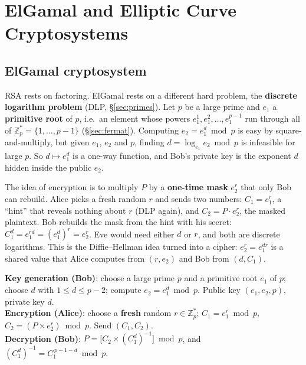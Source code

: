 \section{ElGamal and Elliptic Curve Cryptosystems \new}\label{sec:elgamal}

\subsection{ElGamal cryptosystem \new}

RSA rests on factoring. ElGamal rests on a different hard problem, the \textbf{discrete logarithm problem} (DLP, \S\ref{sec:primes}). Let $p$ be a large prime and $e_1$ a \textbf{primitive root} of $p$, i.e.\ an element whose powers $e_1^1, e_1^2, \dots, e_1^{p-1}$ run through all of $\mathbb{Z}_p^* = \{1, \dots, p-1\}$ (\S\ref{sec:fermat}). Computing $e_2 = e_1^d \bmod p$ is easy by square-and-multiply, but given $e_1$, $e_2$ and $p$, finding $d = \log_{e_1} e_2 \bmod p$ is infeasible for large $p$. So $d \mapsto e_1^d$ is a one-way function, and Bob's private key is the exponent $d$ hidden inside the public $e_2$.

The idea of encryption is to multiply $P$ by a \textbf{one-time mask} $e_2^r$ that only Bob can rebuild. Alice picks a fresh random $r$ and sends two numbers: $C_1 = e_1^r$, a ``hint'' that reveals nothing about $r$ (DLP again), and $C_2 = P \cdot e_2^r$, the masked plaintext. Bob rebuilds the mask from the hint with his secret: $C_1^d = e_1^{rd} = (e_1^d)^r = e_2^r$. Eve would need either $d$ or $r$, and both are discrete logarithms. This is the Diffie--Hellman idea turned into a cipher: $e_2^r = e_1^{dr}$ is a shared value that Alice computes from $(r, e_2)$ and Bob from $(d, C_1)$.

\begin{mustknow}[: ElGamal]
\textbf{Key generation (Bob)}: choose a large prime $p$ and a primitive root $e_1$ of $p$; choose $d$ with $1 \le d \le p - 2$; compute $e_2 = e_1^d \bmod p$. Public key $(e_1, e_2, p)$, private key $d$.\\
\textbf{Encryption (Alice)}: choose a \textbf{fresh} random $r \in \mathbb{Z}_p^*$; \;$C_1 = e_1^r \bmod p$, \;$C_2 = (P \times e_2^r) \bmod p$. Send $(C_1, C_2)$.\\
\textbf{Decryption (Bob)}: $P = \big[C_2 \times (C_1^d)^{-1}\big] \bmod p$, \;and $(C_1^d)^{-1} = C_1^{\,p-1-d} \bmod p$.
\end{mustknow}

